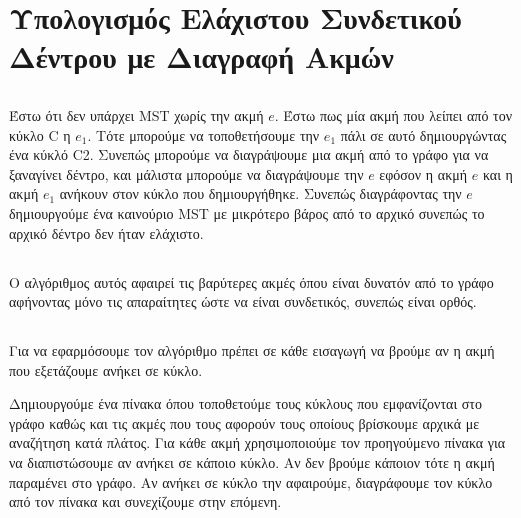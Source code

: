 \documentclass[a4paper,10pt]{article}
\begin{document}
\section{Υπολογισμός Ελάχιστου Συνδετικού Δέντρου με Διαγραφή Ακμών}
\subsection{}
Έστω ότι δεν υπάρχει MST χωρίς την ακμή $e$. Έστω πως μία ακμή που λείπει από τον κύκλο
C η $e_1$. Τότε μπορούμε να τοποθετήσουμε την $e_1$ πάλι σε αυτό
δημιουργώντας ένα κύκλό C2. Συνεπώς μπορούμε να διαγράψουμε μια ακμή από το
γράφο για να ξαναγίνει δέντρο, και μάλιστα μπορούμε να διαγράψουμε την $e$
εφόσον η ακμή $e$ και η ακμή $e_1$ ανήκουν στον κύκλο που δημιουργήθηκε.
Συνεπώς διαγράφοντας την $e$ δημιουργούμε ένα καινούριο MST με μικρότερο
βάρος από το αρχικό συνεπώς το αρχικό δέντρο δεν ήταν ελάχιστο.

\subsection{}
Ο αλγόριθμος αυτός αφαιρεί τις βαρύτερες ακμές όπου είναι δυνατόν από το
γράφο αφήνοντας μόνο τις απαραίτητες ώστε να είναι συνδετικός, συνεπώς είναι ορθός.
\subsection{}
Για να εφαρμόσουμε τον αλγόριθμο πρέπει σε κάθε εισαγωγή να βρούμε αν η ακμή
που εξετάζουμε ανήκει σε κύκλο.

Δημιουργούμε ένα πίνακα όπου τοποθετούμε τους κύκλους που εμφανίζονται στο
γράφο καθώς και τις ακμές που τους αφορούν τους οποίους βρίσκουμε αρχικά 
με αναζήτηση κατά πλάτος.
Για κάθε ακμή χρησιμοποιούμε τον προηγούμενο πίνακα για να διαπιστώσουμε αν
ανήκει σε κάποιο κύκλο. Αν δεν βρούμε κάποιον τότε η ακμή παραμένει στο γράφο.
Αν ανήκει σε κύκλο την αφαιρούμε, διαγράφουμε τον κύκλο από τον πίνακα και
συνεχίζουμε στην επόμενη.
\end{document}
